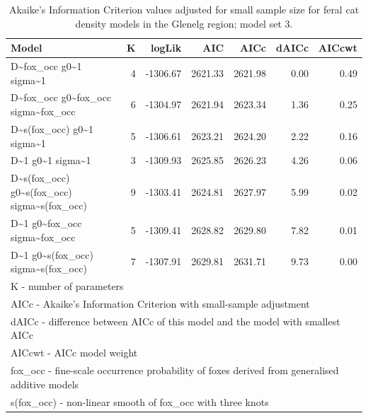 \documentclass[11pt,a4paper,titlepage,twoside,openright]{style/unimelbthesis}
\begin{document}
\begin{mainmatter}
\begingroup\fontsize{10}{12}\selectfont
\begin{longtable}[t]{lrrrrrr}
\caption{\label{tab:density-aic-g-3}Akaike's Information Criterion values adjusted for small sample size for feral cat density models in the Glenelg region; model set 3.}\\
\toprule
Model & K & logLik & AIC & AICc & dAICc & AICcwt\\
\midrule
D\textasciitilde{}fox\_occ g0\textasciitilde{}1 sigma\textasciitilde{}1 & 4 & -1306.67 & 2621.33 & 2621.98 & 0.00 & 0.49\\
D\textasciitilde{}fox\_occ g0\textasciitilde{}fox\_occ sigma\textasciitilde{}fox\_occ & 6 & -1304.97 & 2621.94 & 2623.34 & 1.36 & 0.25\\
D\textasciitilde{}s(fox\_occ) g0\textasciitilde{}1 sigma\textasciitilde{}1 & 5 & -1306.61 & 2623.21 & 2624.20 & 2.22 & 0.16\\
D\textasciitilde{}1 g0\textasciitilde{}1 sigma\textasciitilde{}1 & 3 & -1309.93 & 2625.85 & 2626.23 & 4.26 & 0.06\\
D\textasciitilde{}s(fox\_occ) g0\textasciitilde{}s(fox\_occ) sigma\textasciitilde{}s(fox\_occ) & 9 & -1303.41 & 2624.81 & 2627.97 & 5.99 & 0.02\\
\addlinespace
D\textasciitilde{}1 g0\textasciitilde{}fox\_occ sigma\textasciitilde{}fox\_occ & 5 & -1309.41 & 2628.82 & 2629.80 & 7.82 & 0.01\\
D\textasciitilde{}1 g0\textasciitilde{}s(fox\_occ) sigma\textasciitilde{}s(fox\_occ) & 7 & -1307.91 & 2629.81 & 2631.71 & 9.73 & 0.00\\
\bottomrule
\multicolumn{7}{l}{\rule{0pt}{1em}K - number of parameters}\\
\multicolumn{7}{l}{\rule{0pt}{1em}AICc - Akaike's Information Criterion with small-sample adjustment}\\
\multicolumn{7}{l}{\rule{0pt}{1em}dAICc - difference between AICc of this model and the model with smallest AICc}\\
\multicolumn{7}{l}{\rule{0pt}{1em}AICcwt - AICc model weight}\\
\multicolumn{7}{l}{\rule{0pt}{1em}fox\_occ - fine-scale occurrence probability of foxes derived from generalised additive models}\\
\multicolumn{7}{l}{\rule{0pt}{1em}s(fox\_occ) - non-linear smooth of fox\_occ with three knots}\\
\end{longtable}
\endgroup{}

\newpage


\end{mainmatter}
\end{document}
